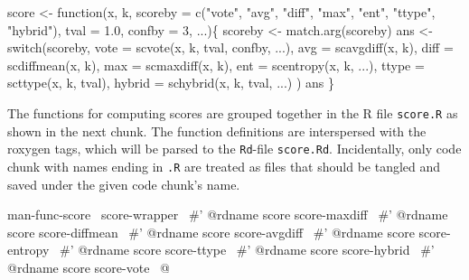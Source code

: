 \documentclass[a4paper]{article}
\begin{document}
\nwenddocs{}\endmoddef
score <- function(x, k,
                  scoreby = c("vote", "avg", "diff", "max", "ent",
                              "ttype", "hybrid"),
                  tval = 1.0, confby = 3, ...)\{
    scoreby <- match.arg(scoreby)
    ans <- switch(scoreby,
                  vote = scvote(x, k, tval, confby, ...),
                  avg = scavgdiff(x, k),
                  diff = scdiffmean(x, k),
                  max = scmaxdiff(x, k),
                  ent = scentropy(x, k, ...),
                  ttype = scttype(x, k, tval),
                  hybrid = schybrid(x, k, tval, ...)
                  )
    ans
\}
\eatline
{}\nwendcode{}%

The functions for computing scores are grouped together in the R file
\verb?score.R? as shown in the next chunk. The function definitions are
interspersed with the roxygen tags, which will be parsed to the
\verb?Rd?-file \verb?score.Rd?. Incidentally, only code chunk with names
ending in \verb?.R? are treated as files that should be tangled and saved
under the given code chunk's name.

\nwenddocs{}\endmoddef\let\nwnotused=\nwoutput{}
\LA{}man-func-score~{\nwtagstyle{}}\RA{}
\LA{}score-wrapper~{\nwtagstyle{}}\RA{}
#' @rdname score
\LA{}score-maxdiff~{\nwtagstyle{}}\RA{}
#' @rdname score
\LA{}score-diffmean~{\nwtagstyle{}}\RA{}
#' @rdname score
\LA{}score-avgdiff~{\nwtagstyle{}}\RA{}
#' @rdname score
\LA{}score-entropy~{\nwtagstyle{}}\RA{}
#' @rdname score
\LA{}score-ttype~{\nwtagstyle{}}\RA{}
#' @rdname score
\LA{}score-hybrid~{\nwtagstyle{}}\RA{}
#' @rdname score
\LA{}score-vote~{\nwtagstyle{}}\RA{}
\nwnotused{score.R}\nwendcode{}@
\end{document}
